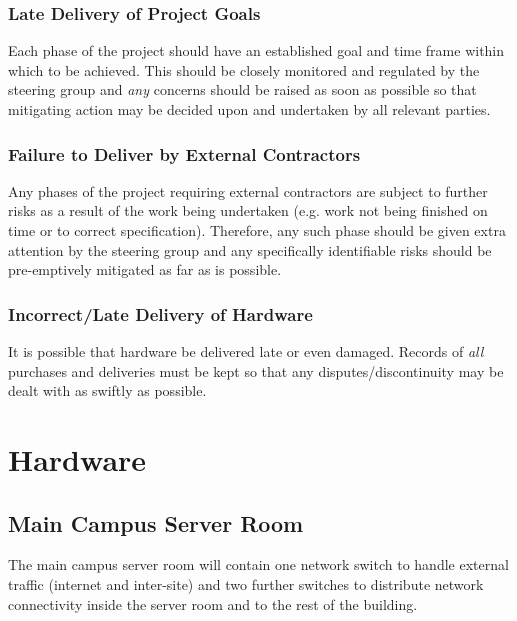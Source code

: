 \documentclass[a4paper, twoside]{article}
\begin{document}
\subsubsection{Late Delivery of Project Goals}
Each phase of the project should have an established goal and time frame within
which to be achieved. This should be closely monitored and regulated by the
steering group and \emph{any} concerns should be raised as soon as possible so
that mitigating action may be decided upon and undertaken by all relevant
parties.

\subsubsection{Failure to Deliver by External Contractors}
Any phases of the project requiring external contractors are subject to further
risks as a result of the work being undertaken (e.g. work not being finished on
time or to correct specification). Therefore, any such phase should be given
extra attention by the steering group and any specifically identifiable risks
should be pre-emptively mitigated as far as is possible.

\subsubsection{Incorrect/Late Delivery of Hardware}
It is possible that hardware be delivered late or even damaged. Records of
\emph{all} purchases and deliveries must be kept so that any
disputes/discontinuity may be dealt with as swiftly as possible.

\section{Hardware}
\subsection{Main Campus Server Room}
The main campus server room will contain one network switch to handle external
traffic (internet and inter-site) and two further switches to distribute network
connectivity inside the server room and to the rest of the building.
\end{document}
